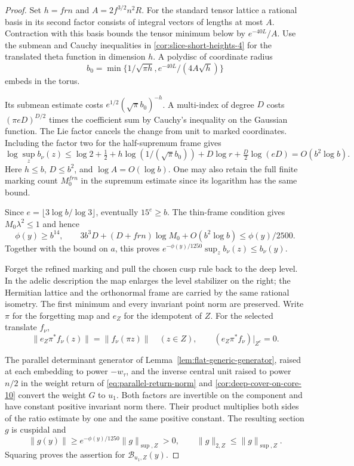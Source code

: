 \begin{proof}
Set \(h=frn\) and \(A=2f^{3/2}n^2R\).
For the standard tensor lattice a rational basis in its second
factor consists of integral vectors of lengths at most \(A\). Contraction with this basis
bounds the tensor minimum below by \(e^{-40L}/A\).
Use the submean and Cauchy inequalities in
\ref{cor:slice-short-heights-4} for the translated theta function
in dimension \(h\). A polydisc of coordinate radius
\[
 b_0=\min\{1/\sqrt{\pi h},e^{-40L}/(4A\sqrt h)\}
\]
embeds in the torus.

Its submean estimate costs
\(e^{1/2}(\sqrt\pi b_0)^{-h}\). A multi-index of degree \(D\)
costs \((\pi eD)^{D/2}\) times the coefficient sum by Cauchy's
inequality on the Gaussian function. The Lie factor cancels the
change from unit to marked coordinates. Including the factor two
for the half-supremum frame gives
\[
 \log\sup_z b_\nu(z)\le \log 2+\tfrac12
      +h\log(1/(\sqrt\pi b_0))+D\log r+\tfrac D2\log(eD)
       =O(b^2\log b).
\]
Here \(h\le b\), \(D\le b^2\), and \(\log A=O(\log b)\).
One may also retain the full finite marking count
\(M_0^{frn}\) in the supremum estimate since its logarithm has
the same bound.

Since \(e=\lfloor3\log b/\log3\rfloor\), eventually \(15^e\ge b\).
The thin-frame condition gives \(M_0\lambda^2\le1\) and hence
\[
 \phi(y)\ge b^{14},\qquad
 3b^3D+(D+frn)\log M_0+O(b^2\log b)\le \phi(y)/2500 .
\]
Together with the bound on \(a\), this proves
\(e^{-\phi(y)/1250}\sup_z b_\nu(z)\le b_\nu(y)\).

Forget the refined marking and pull the chosen cusp rule back to
the deep level. In the adelic description the map enlarges the
level stabilizer on the right; the Hermitian lattice and the
orthonormal frame are carried by the same rational isometry.
The first minimum and every invariant point norm are preserved.
Write \(\pi\) for the forgetting map and \(e_Z\) for the idempotent of \(Z\). For the selected translate \(f_\nu\),
\[
 \|e_Z\pi^* f_\nu(z)\|=\|f_\nu(\pi z)\|\quad(z\in Z),
 \qquad (e_Z\pi^* f_\nu)|_{Z^c}=0 .
\]

The parallel determinant generator of Lemma~\ref{lem:flat-generic-generator},
raised at each embedding to power \(-w_\tau\), and the inverse central unit raised to power \(n/2\) in the weight return of
\eqref{eq:parallel-return-norm} and \ref{cor:deep-cover-on-core-10} convert the weight \(G\) to
\(u_1\). Both factors are invertible on the component and have
constant positive invariant norm there. Their product multiplies
both sides of the ratio estimate by one and the same positive
constant. The resulting section \(g\) is cuspidal and
\[
 \|g(y)\|\ge e^{-\phi(y)/1250}\|g\|_{\sup,Z}>0,\qquad
 \|g\|_{2,Z}\le\|g\|_{\sup,Z}.
\]
Squaring proves the assertion for \(\mathcal B_{u_1,Z}(y)\).
\end{proof}
